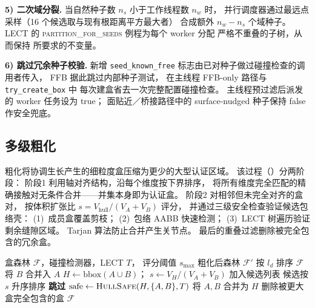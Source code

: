 \documentclass[journal]{IEEEtran}
\begin{document}
\textbf{5) 二次域分裂.}
当自然种子数 $n_s$ 小于工作线程数 $n_w$ 时，
并行调度器通过最远点采样（16 个候选取与现有根距离平方最大者）
合成额外 $n_w-n_s$ 个域种子。
LECT 的 \textsc{partition\_for\_seeds} 例程为每个 worker 分配
严格不重叠的子树，从而保持  所要求的不变量。

\textbf{6) 跳过冗余种子校验.}
新增 \texttt{seed\_known\_free} 标志由已对种子做过碰撞检查的调用者传入，
FFB 据此跳过内部种子测试，
在主线程 FFB-only 路径与 \texttt{try\_create\_box} 中
每次建盒省去一次完整配置碰撞检查。
主线程预过滤后派发的 worker 任务设为 true；
面贴近／桥接路径中的 surface-nudged 种子保持 false 作安全兜底。

\subsection{多级粗化}

粗化将协调生长产生的细粒度盒压缩为更少的大型认证区域。
该过程（）分两阶段：
阶段1 利用轴对齐结构，沿每个维度按下界排序，
将所有维度完全匹配的精确接触对无条件合并——并集本身即为认证盒。
阶段2 对相邻但未完全对齐的盒对，
按体积扩张比 $s = V_{\text{hull}}/(V_A{+}V_B)$ 评分，
并通过三级安全检查验证候选包络壳：
(1)~成员盒覆盖剪枝；
(2)~包络 AABB 快速检测；
(3)~LECT 树遍历验证剩余缝隙区域。
Tarjan 算法防止合并产生关节点。
最后的重叠过滤删除被完全包含的冗余盒。

\begin{algorithm}[t]
\caption{多级粗化}\label{alg:coarsen}
\footnotesize
\begin{algorithmic}[1]
\REQUIRE 盒森林 $\mathcal{F}$，碰撞检测器，LECT $T$，
  评分阈值 $s_{\max}$
\ENSURE 粗化后森林 $\mathcal{F}'$
\STATE {}
  \STATE 按 $l_d$ 排序 $\mathcal{F}$
    \STATE 将 $B$ 合并入 $A$  \hfill{}
  \ENDFOR
\ENDFOR
\STATE {}
  \STATE $H \leftarrow \mathrm{bbox}(A \cup B)$；
    $s \leftarrow V_H / (V_A + V_B)$
    \STATE 加入候选列表
  \ENDIF
\ENDFOR
\STATE 候选按 $s$ 升序排序
    \STATE \textbf{跳过}  \hfill{}
  \ENDIF
  \STATE $\text{safe} \leftarrow \textsc{HullSafe}(H, \{A,B\}, T)$
    \hfill{}
    \STATE 将 $A, B$ 合并为 $H$
  \ENDIF
\ENDFOR
\STATE 删除被更大盒完全包含的盒
\RETURN $\mathcal{F}$
\end{algorithmic}
\end{algorithm}
\end{document}
